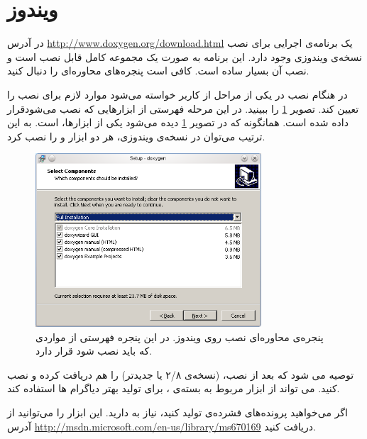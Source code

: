 \section{ویندوز}
\begin{sloppypar}
در آدرس 
\url{http://www.doxygen.org/download.html} 
یک برنامه‌ی اجرایی برای نصب نسخه‌ی ویندوزی وجود دارد. این برنامه به صورت یک مجموعه کامل قابل نصب است و نصب آن بسیار ساده است. 
کافی است پنجره‌های محاوره‌ای را دنبال کنید.
\end{sloppypar}

در هنگام نصب در یکی از مراحل از کاربر خواسته می‌شود موارد لازم برای نصب را تعیین کند. 
تصویر \ref{پنجره_نصب_روی_ویندوز} را ببینید. در این مرحله 
فهرستی از ابزارهایی که نصب می‌شودقرار داده شده است. 
همانگونه که در تصویر \ref{پنجره_نصب_روی_ویندوز} دیده می‌شود یکی از ابزارها،  است. 
به این ترتیب می‌توان در نسخه‌ی ویندوزی، هر دو ابزار  و  را نصب کرد.

\begin{figure}
\centering
\includegraphics[width=0.75\textwidth]{image/windows_setup}
\caption[
پنجره‌ی محاوره‌ای نصب
{}
 روی ویندوز
]{
پنجره‌ی محاوره‌ای نصب
{}
 روی ویندوز. در این پنجره فهرستی از مواردی که باید نصب شود قرار دارد.
}
\label{پنجره_نصب_روی_ویندوز}
\end{figure}

توصیه می شود که بعد از نصب،
(نسخه‌ی ۲/۸ یا جدیدتر) را هم دریافت کرده و نصب کنید.
 می تواند از ابزار
 مربوط به بسته‌ی
، برای تولید بهتر دیاگرام ها استفاده کند.

\begin{sloppypar}
اگر می‌خواهید پرونده‌های فشرده‌ی  تولید کنید، نیاز به 
دارید. این ابزار را می‌توانید از آدرس 
\url{http://msdn.microsoft.com/en-us/library/ms670169}
 دریافت کنید.
\end{sloppypar}

